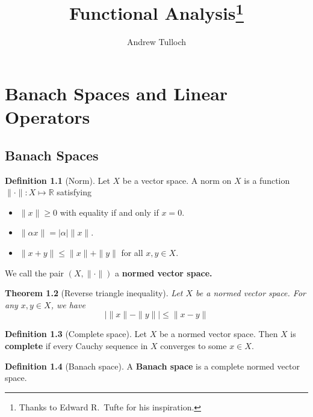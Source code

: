\documentclass[justified]{tufte-book}
\title{Functional Analysis\thanks{Thanks to Edward R.~Tufte for his inspiration.}}
\author{Andrew Tulloch}
\theoremstyle{plain}%
\newtheorem{thm}{Theorem}[chapter]
\theoremstyle{definition}
\newtheorem{defn}[thm]{Definition}
\theoremstyle{remark}
\newcommand{\R}{\mathbb{R}}
\begin{document}
\frontmatter
\maketitle
\tableofcontents
\cleardoublepage
\mainmatter

\chapter{Banach Spaces and Linear Operators}

\section{Banach Spaces} %
\label{sec:banach_spaces}

\begin{defn}[Norm]
	Let $X$ be a vector space.  A norm on $X$ is a function $\| \cdot \| : X \mapsto \R$ satisfying 
	\begin{itemize}
		\item $\| x \| \geq 0$ with equality if and only if $x = 0$.  
		\item $\| \alpha x \| = | \alpha | \| x \|$.
		\item $\| x + y \| \leq \| x \| + \| y \|$ for all $x, y \in X$.  
	\end{itemize}
	
	We call the pair $(X, \| \cdot \|)$ a \textbf{normed vector space.}
\end{defn}

\begin{thm}[Reverse triangle inequality]
	Let $X$ be a normed vector space.  For any $x, y \in X$, we have \[
		\left| \|x \| - \| y \| \right| \leq \| x - y \|  
	\]
\end{thm}

\begin{defn}[Complete space]
	Let $X$ be a normed vector space.  Then $X$ is \textbf{complete} if every Cauchy sequence in $X$ converges to some $x \in X$.  
\end{defn}

\begin{defn}[Banach space]
	A \textbf{Banach space} is a complete normed vector space.
\end{defn}
\end{document}
